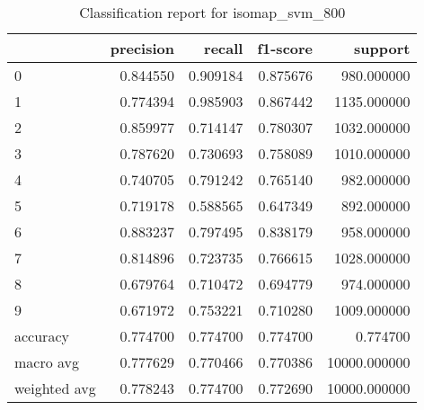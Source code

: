\begin{table}[htb!]
\centering
\caption{Classification report for isomap_svm_800}
\label{tab:classification-report-isomap_svm_800}
\begin{tabular}{lrrrr}
\toprule
 & precision & recall & f1-score & support \\
\midrule
0 & 0.844550 & 0.909184 & 0.875676 & 980.000000 \\
1 & 0.774394 & 0.985903 & 0.867442 & 1135.000000 \\
2 & 0.859977 & 0.714147 & 0.780307 & 1032.000000 \\
3 & 0.787620 & 0.730693 & 0.758089 & 1010.000000 \\
4 & 0.740705 & 0.791242 & 0.765140 & 982.000000 \\
5 & 0.719178 & 0.588565 & 0.647349 & 892.000000 \\
6 & 0.883237 & 0.797495 & 0.838179 & 958.000000 \\
7 & 0.814896 & 0.723735 & 0.766615 & 1028.000000 \\
8 & 0.679764 & 0.710472 & 0.694779 & 974.000000 \\
9 & 0.671972 & 0.753221 & 0.710280 & 1009.000000 \\
accuracy & 0.774700 & 0.774700 & 0.774700 & 0.774700 \\
macro avg & 0.777629 & 0.770466 & 0.770386 & 10000.000000 \\
weighted avg & 0.778243 & 0.774700 & 0.772690 & 10000.000000 \\
\bottomrule
\end{tabular}
\end{table}
